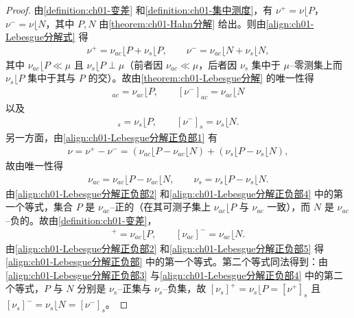 \documentclass[../../main.tex]{subfiles}%
\begin{document}
\begin{proof}
由\cref{definition:ch01-变差} 和\cref{definition:ch01-集中测度}，有 $\nu^+=\nu\lfloor P$，$\nu^-=\nu\lfloor N$，其中 $P,N$ 由\cref{theorem:ch01-Hahn分解} 给出。则由\eqref{align:ch01-Lebesgue分解式} 得
\begin{align}
\nu^+=\nu_{ac}\lfloor P+\nu_s\lfloor P,\qquad
\nu^-=\nu_{ac}\lfloor N+\nu_s\lfloor N, \label{align:ch01-Lebesgue分解正负部1}
\end{align}
其中 $\nu_{ac}\lfloor P\ll\mu$ 且 $\nu_s\lfloor P\perp\mu$（前者因 $\nu_{ac}\ll\mu$，后者因 $\nu_s$ 集中于 $\mu$--零测集上而 $\nu_s\lfloor P$ 集中于其与 $P$ 的交）。故由\cref{theorem:ch01-Lebesgue分解} 的唯一性得
\begin{align}
[\nu^+]_{ac}=\nu_{ac}\lfloor P,\qquad [\nu^-]_{ac}=\nu_{ac}\lfloor N \label{align:ch01-Lebesgue分解正负部2}
\end{align}
以及
\begin{align}
[\nu^+]_s=\nu_s\lfloor P,\qquad [\nu^-]_s=\nu_s\lfloor N. \label{align:ch01-Lebesgue分解正负部3}
\end{align}
另一方面，由\eqref{align:ch01-Lebesgue分解正负部1} 有
\begin{align*}
\nu=\nu^+-\nu^-=(\nu_{ac}\lfloor P-\nu_{ac}\lfloor N)+(\nu_s\lfloor P-\nu_s\lfloor N),
\end{align*}
故由唯一性得
\begin{align}
\nu_{ac}=\nu_{ac}\lfloor P-\nu_{ac}\lfloor N,\qquad
\nu_s=\nu_s\lfloor P-\nu_s\lfloor N. \label{align:ch01-Lebesgue分解正负部4}
\end{align}
由\eqref{align:ch01-Lebesgue分解正负部2} 和\eqref{align:ch01-Lebesgue分解正负部4} 中的第一个等式，集合 $P$ 是 $\nu_{ac}$--正的（在其可测子集上 $\nu_{ac}\lfloor P$ 与 $\nu_{ac}$ 一致），而 $N$ 是 $\nu_{ac}$--负的。故由\cref{definition:ch01-变差}，
\begin{align}
[\nu_{ac}]^+=\nu_{ac}\lfloor P,\qquad [\nu_{ac}]^-=\nu_{ac}\lfloor N. \label{align:ch01-Lebesgue分解正负部5}
\end{align}
由\eqref{align:ch01-Lebesgue分解正负部2} 和\eqref{align:ch01-Lebesgue分解正负部5} 得\eqref{align:ch01-Lebesgue分解正负部} 中的第一个等式。第二个等式同法得到：由\eqref{align:ch01-Lebesgue分解正负部3} 与\eqref{align:ch01-Lebesgue分解正负部4} 中的第二个等式，$P$ 与 $N$ 分别是 $\nu_s$--正集与 $\nu_s$--负集，故 $[\nu_s]^+=\nu_s\lfloor P=[\nu^+]_s$ 且 $[\nu_s]^-=\nu_s\lfloor N=[\nu^-]_s$。
\end{proof}
\end{document}
